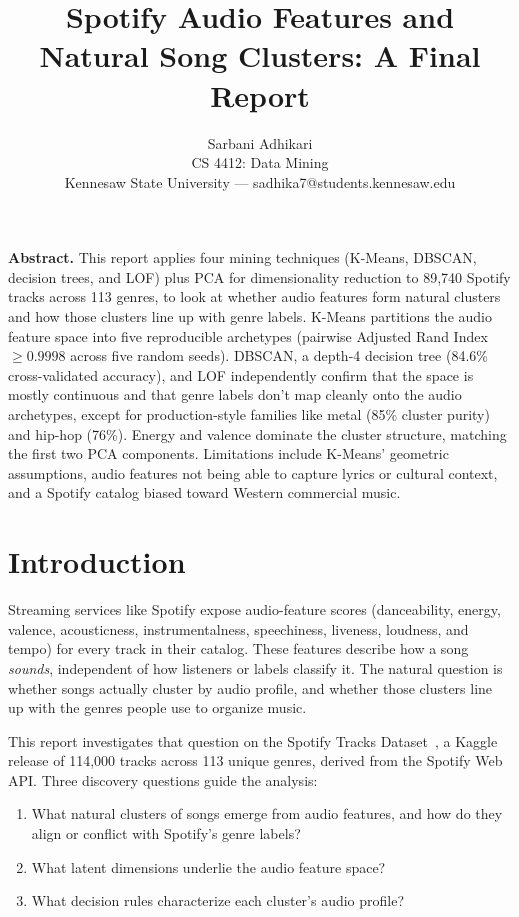 \documentclass[10pt,twocolumn]{article}
\title{\Large\bfseries Spotify Audio Features and Natural Song Clusters: A Final Report}
\author{Sarbani Adhikari\\
\small CS 4412: Data Mining\\
\small Kennesaw State University --- sadhika7@students.kennesaw.edu}
\date{}
\begin{document}
\maketitle

\begin{center}
\begin{minipage}{0.92\columnwidth}
\small\textbf{Abstract.} This report applies four mining techniques (K-Means, DBSCAN, decision trees, and LOF) plus PCA for dimensionality reduction to 89,740 Spotify tracks across 113 genres, to look at whether audio features form natural clusters and how those clusters line up with genre labels. K-Means partitions the audio feature space into five reproducible archetypes (pairwise Adjusted Rand Index $\geq 0.9998$ across five random seeds). DBSCAN, a depth-4 decision tree (84.6\% cross-validated accuracy), and LOF independently confirm that the space is mostly continuous and that genre labels don't map cleanly onto the audio archetypes, except for production-style families like metal (85\% cluster purity) and hip-hop (76\%). Energy and valence dominate the cluster structure, matching the first two PCA components. Limitations include K-Means' geometric assumptions, audio features not being able to capture lyrics or cultural context, and a Spotify catalog biased toward Western commercial music.
\end{minipage}
\end{center}

\section{Introduction}

Streaming services like Spotify expose audio-feature scores (danceability, energy, valence, acousticness, instrumentalness, speechiness, liveness, loudness, and tempo) for every track in their catalog. These features describe how a song \emph{sounds}, independent of how listeners or labels classify it. The natural question is whether songs actually cluster by audio profile, and whether those clusters line up with the genres people use to organize music.

This report investigates that question on the Spotify Tracks Dataset~\cite{b1}, a Kaggle release of 114,000 tracks across 113 unique genres, derived from the Spotify Web API. Three discovery questions guide the analysis:
\begin{enumerate}
    \item What natural clusters of songs emerge from audio features, and how do they align or conflict with Spotify's genre labels?
    \item What latent dimensions underlie the audio feature space?
    \item What decision rules characterize each cluster's audio profile?
\end{enumerate}
\end{document}
